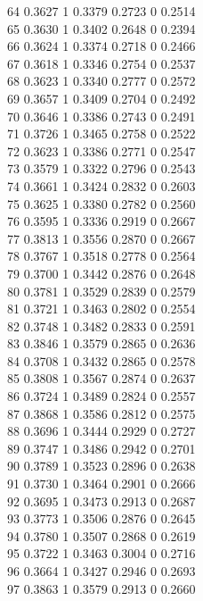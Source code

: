 \documentclass[
]{article}
\begin{document}
64 0.3627 1 0.3379 0.2723 0 0.2514\\
65 0.3630 1 0.3402 0.2648 0 0.2394\\
66 0.3624 1 0.3374 0.2718 0 0.2466\\
67 0.3618 1 0.3346 0.2754 0 0.2537\\
68 0.3623 1 0.3340 0.2777 0 0.2572\\
69 0.3657 1 0.3409 0.2704 0 0.2492\\
70 0.3646 1 0.3386 0.2743 0 0.2491\\
71 0.3726 1 0.3465 0.2758 0 0.2522\\
72 0.3623 1 0.3386 0.2771 0 0.2547\\
73 0.3579 1 0.3322 0.2796 0 0.2543\\
74 0.3661 1 0.3424 0.2832 0 0.2603\\
75 0.3625 1 0.3380 0.2782 0 0.2560\\
76 0.3595 1 0.3336 0.2919 0 0.2667\\
77 0.3813 1 0.3556 0.2870 0 0.2667\\
78 0.3767 1 0.3518 0.2778 0 0.2564\\
79 0.3700 1 0.3442 0.2876 0 0.2648\\
80 0.3781 1 0.3529 0.2839 0 0.2579\\
81 0.3721 1 0.3463 0.2802 0 0.2554\\
82 0.3748 1 0.3482 0.2833 0 0.2591\\
83 0.3846 1 0.3579 0.2865 0 0.2636\\
84 0.3708 1 0.3432 0.2865 0 0.2578\\
85 0.3808 1 0.3567 0.2874 0 0.2637\\
86 0.3724 1 0.3489 0.2824 0 0.2557\\
87 0.3868 1 0.3586 0.2812 0 0.2575\\
88 0.3696 1 0.3444 0.2929 0 0.2727\\
89 0.3747 1 0.3486 0.2942 0 0.2701\\
90 0.3789 1 0.3523 0.2896 0 0.2638\\
91 0.3730 1 0.3464 0.2901 0 0.2666\\
92 0.3695 1 0.3473 0.2913 0 0.2687\\
93 0.3773 1 0.3506 0.2876 0 0.2645\\
94 0.3780 1 0.3507 0.2868 0 0.2619\\
95 0.3722 1 0.3463 0.3004 0 0.2716\\
96 0.3664 1 0.3427 0.2946 0 0.2693\\
97 0.3863 1 0.3579 0.2913 0 0.2660\\
\end{document}
